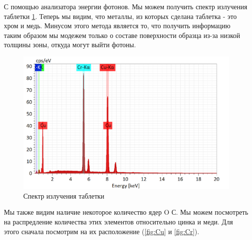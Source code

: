 \documentclass[a4paper,12pt]{article}
\begin{document}
С помощью анализатора энергии фотонов. Мы можем получить спектр излучения таблетки \ref{fig:spectra}.  Теперь мы видим, что металлы, из которых сделана таблетка - это хром и медь. Минусом этого метода является то, что получить информацию таким образом мы модежем только о составе поверхности образца из-за низкой толщины зоны, откуда могут выйти фотоны.

\begin{figure}[h]
    \centering
    \includegraphics[width=0.9\linewidth]{Spectra.png}
    \caption{Спектр излучения таблетки}
    \label{fig:spectra}
\end{figure}
 Мы также видим наличие некоторое количество ядер O С.
 Мы можем посмотреть на распредление количества этих элементов относительно цинка и меди. Для этого сначала посмотрим на их расположение (\ref{fig:Cu} и \ref{fig:Cr}).
 
\end{document}
